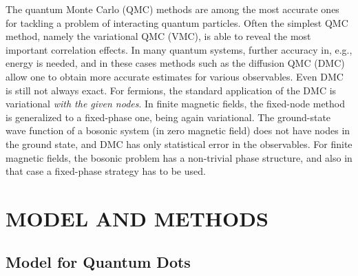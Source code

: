 \documentclass{article}
\begin{document}
The quantum Monte Carlo (QMC) methods are among the most accurate ones
for tackling a problem of interacting quantum particles\cite{QMCRMP}.
Often the simplest QMC method, namely the variational QMC (VMC), is
able to reveal the most important correlation effects. In many quantum
systems, further accuracy in, e.g., energy is needed, and in these
cases methods such as the diffusion QMC (DMC) allow one to obtain more
accurate estimates for various observables. Even DMC is still not
always exact. For fermions, the standard application of the DMC is
variational {\sl with the given nodes}. In finite magnetic fields, the
fixed-node method is generalized to a fixed-phase one, being again
variational\cite{fp}. The ground-state wave function of a bosonic
system (in zero magnetic field) does not have nodes in the ground
state, and DMC has only statistical error in the observables. For
finite magnetic fields, the bosonic problem has a non-trivial phase
structure, and also in that case a fixed-phase strategy has to be
used.

\section{MODEL AND METHODS}

\subsection{Model for Quantum Dots}\label{junk}
\end{document}
